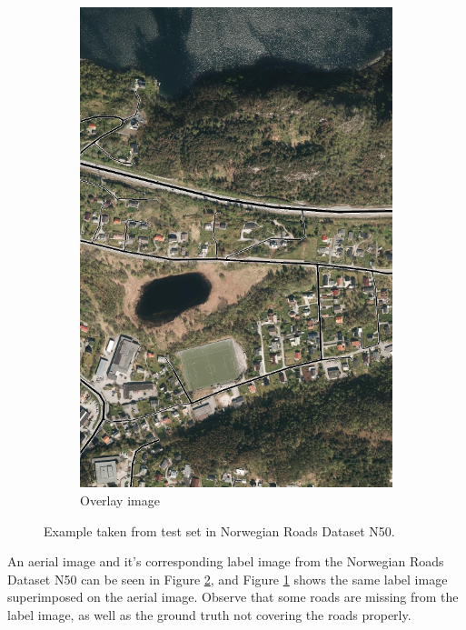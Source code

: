 \begin{figure}
\begin{subfigure}{0.32\textwidth}
\includegraphics[width=\linewidth]{figs/datasets/Norwegian_roads_overlay_example2.png}
\caption{Overlay image} \label{fig:norwegian_roads_example_overlay}
\end{subfigure}
\hspace*{\fill} %
\caption{Example taken from test set in Norwegian Roads Dataset N50.} \label{fig:norwegian_roads_example}
\end{figure}

An aerial image and it's corresponding label image from the Norwegian Roads Dataset N50 can be seen in Figure \ref{fig:norwegian_roads_example}, and Figure \ref{fig:norwegian_roads_example_overlay} shows the same label image superimposed on the aerial image. Observe that some roads are missing from the label image, as well as the ground truth not covering the roads properly. \\
